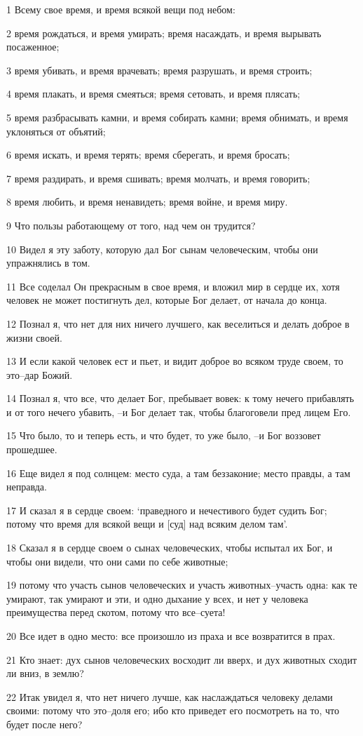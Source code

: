 \par 1 Всему свое время, и время всякой вещи под небом:
\par 2 время рождаться, и время умирать; время насаждать, и время вырывать посаженное;
\par 3 время убивать, и время врачевать; время разрушать, и время строить;
\par 4 время плакать, и время смеяться; время сетовать, и время плясать;
\par 5 время разбрасывать камни, и время собирать камни; время обнимать, и время уклоняться от объятий;
\par 6 время искать, и время терять; время сберегать, и время бросать;
\par 7 время раздирать, и время сшивать; время молчать, и время говорить;
\par 8 время любить, и время ненавидеть; время войне, и время миру.
\par 9 Что пользы работающему от того, над чем он трудится?
\par 10 Видел я эту заботу, которую дал Бог сынам человеческим, чтобы они упражнялись в том.
\par 11 Все соделал Он прекрасным в свое время, и вложил мир в сердце их, хотя человек не может постигнуть дел, которые Бог делает, от начала до конца.
\par 12 Познал я, что нет для них ничего лучшего, как веселиться и делать доброе в жизни своей.
\par 13 И если какой человек ест и пьет, и видит доброе во всяком труде своем, то это--дар Божий.
\par 14 Познал я, что все, что делает Бог, пребывает вовек: к тому нечего прибавлять и от того нечего убавить, --и Бог делает так, чтобы благоговели пред лицем Его.
\par 15 Что было, то и теперь есть, и что будет, то уже было, --и Бог воззовет прошедшее.
\par 16 Еще видел я под солнцем: место суда, а там беззаконие; место правды, а там неправда.
\par 17 И сказал я в сердце своем: `праведного и нечестивого будет судить Бог; потому что время для всякой вещи и [суд] над всяким делом там'.
\par 18 Сказал я в сердце своем о сынах человеческих, чтобы испытал их Бог, и чтобы они видели, что они сами по себе животные;
\par 19 потому что участь сынов человеческих и участь животных--участь одна: как те умирают, так умирают и эти, и одно дыхание у всех, и нет у человека преимущества перед скотом, потому что все--суета!
\par 20 Все идет в одно место: все произошло из праха и все возвратится в прах.
\par 21 Кто знает: дух сынов человеческих восходит ли вверх, и дух животных сходит ли вниз, в землю?
\par 22 Итак увидел я, что нет ничего лучше, как наслаждаться человеку делами своими: потому что это--доля его; ибо кто приведет его посмотреть на то, что будет после него?


